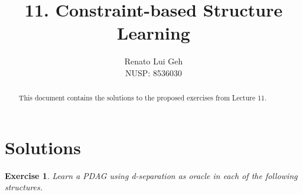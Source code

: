 \documentclass{amsart}
\title[]{11. Constraint-based Structure Learning}
\author[]{Renato Lui Geh\\NUSP\@: 8536030}
\theoremstyle{plain}
\newtheorem{exercise}{Exercise}
\begin{document}
\begin{abstract}
  This document contains the solutions to the proposed exercises from Lecture 11.
  \vspace*{-2.5em}
\end{abstract}

\maketitle

\section{Solutions}

\begin{exercise}
  Learn a PDAG using d-separation as oracle in each of the following structures.
\end{exercise}
\end{document}
